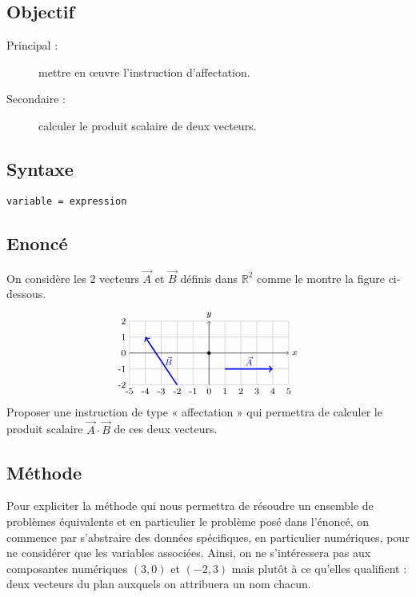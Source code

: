 \subsection{Objectif}\label{affectation:maths:objectif}
\begin{description}
\item[Principal : ] mettre en \oe uvre l'instruction d'affectation.
\item[Secondaire :] calculer le produit scalaire de deux vecteurs.
\end{description}

\subsection{Syntaxe \python}\label{affectation:maths:python}
\begin{description}
\item[\texttt{variable = expression}]\mbox{}
\end{description}

\subsection{Enoncé}\label{affectation:maths:enonce}
On considère les 2 vecteurs $\vec{A}$ et $\vec{B}$ définis dans $\mathbb{R}^2$ 
comme le montre la figure ci-dessous.
$$
\begin{tikzpicture}[scale=0.5]\footnotesize
\draw[color=lightgray](-5,-2) grid[xstep=1,ystep=1] (5,2);
\foreach \x in {-5,-4,...,5} \draw(\x,-2) node[below]{\x};
\foreach \y in {-2,-1,...,2} \draw(-5,\y) node[left]{\y};
\filldraw(0,0) circle (0.1);
\draw[->] (-5,0) -- (5,0);
\draw (5,0) node[right]{$x$} ;
\draw[->] (0,-2) -- (0,2);
\draw (0,2) node[above]{$y$};
\draw[->,very thick,color=blue] (1,-1) -- (4,-1);
\draw[->,very thick,color=blue] (-2,-2) -- (-4,1);
\draw (2.5,-1) node[above,color=blue]{$\vec{A}$};
\draw (-3,-0.5) node[right,color=blue]{$\vec{B}$};
\end{tikzpicture}
$$
Proposer une instruction de type « affectation » qui permettra de calculer le produit scalaire
$\vec{A}\cdot\vec{B}$ de ces deux vecteurs.


\subsection{Méthode}\label{affectation:maths:methode}
Pour expliciter la méthode qui nous permettra de résoudre un ensemble de problèmes 
équivalents et en particulier le problème posé dans l'énoncé, on commence par s'abstraire 
des données spécifiques, en particulier numériques, pour ne considérer que les variables associées. 
Ainsi, on ne s'intéressera pas aux composantes numériques $(3,0)$ et $(-2,3)$ mais
plutôt à ce qu'elles qualifient : deux vecteurs du plan auxquels on attribuera un nom chacun.

